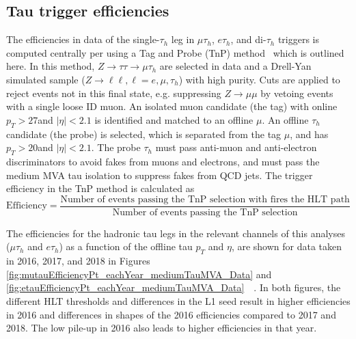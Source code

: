 \subsection{Tau trigger efficiencies}
The efficiencies in data of the single-$\tau_{h}$ leg in $\mu\tau_{h}$, $e\tau_{h}$, and di-$\tau_{h}$ triggers is computed centrally per using a Tag and Probe (TnP) method~\cite{CMS-DP-2019-012} which is outlined here. In this method, $Z \rightarrow \tau\tau \rightarrow \mu\tau_{h}$ are selected in data and a Drell-Yan simulated sample ($Z \rightarrow \ell\ell, \ell = e, \mu, \tau_{h}$) with high purity. Cuts are applied to reject events not in this final state, e.g. suppressing $Z \rightarrow \mu\mu$ by vetoing events with a single loose ID muon. An isolated muon candidate (the tag) with online $p_{T} > 27$\GeV and $|\eta| < 2.1$ is identified and matched to an offline $\mu$. An offline $\tau_{h}$ candidate (the probe) is selected, which is separated from the tag $\mu$, and has $p_{T} > 20$\GeV and $|\eta| < 2.1$. The probe $\tau_{h}$ must pass anti-muon and anti-electron discriminators to avoid fakes from muons and electrons, and must pass the medium MVA tau isolation to suppress fakes from QCD jets. The trigger efficiency in the TnP method is calculated as 
\begin{equation}
    \text{Efficiency} = \frac{\text{Number of events passing the TnP selection with fires the HLT path}}{\text{Number of events passing the TnP selection}}
\end{equation}


The efficiencies for the hadronic tau legs in the relevant channels of this analyses ($\mu\tau_{h}$ and $e\tau_{h}$) as a function of the offline tau $p_{T}$ and $\eta$, are shown for data taken in 2016, 2017, and 2018 in Figures \ref{fig:mutauEfficiencyPt_eachYear_mediumTauMVA_Data} and \ref{fig:etauEfficiencyPt_eachYear_mediumTauMVA_Data}~\cite{CMS-DP-2019-012}~\cite{twiki_Tau_Lepton_Run_2_trigger_performance}. In both figures, the different HLT thresholds and differences in the L1 seed result in higher efficiencies in 2016 and differences in shapes of the 2016 efficiencies compared to 2017 and 2018. The low pile-up in 2016 also leads to higher efficiencies in that year.


